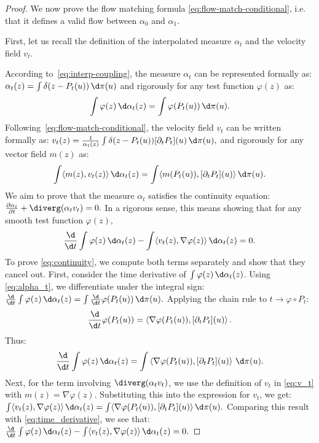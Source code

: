 \begin{proof} We now prove the flow matching formula \eqref{eq:flow-match-conditional}, i.e. that it defines a valid flow between $\alpha_0$ and $\alpha_1$.

First, let us recall the definition of the interpolated measure \(\alpha_t\) and the velocity field \(v_t\).

According to~\eqref{eq:interp-coupling}, the measure \(\alpha_t\) can be represented formally as: \(\alpha_t(z) = \int \delta(z - P_t(u)) \, \d\pi(u)\)
and rigorously for any test function \(\varphi(z)\) as:
\begin{equation}
\int \varphi(z) \, \d\alpha_t(z) = \int \varphi(P_t(u)) \, \d \pi(u). \label{eq:alpha_t}
\end{equation}
Following~\eqref{eq:flow-match-conditional}, the velocity field \(v_t\) can be written formally as: \(v_t(z) = \frac{1}{\alpha_t(z)} \int \delta(z - P_t(u)) [\partial_t P_t](u) \, \d\pi(u),\)
and rigorously for any vector field \(m(z)\) as:
\begin{equation}
\int \langle m(z), v_t(z) \rangle \, \d\alpha_t(z) = \int \langle m(P_t(u)), [\partial_t P_t](u) \rangle \, \d\pi(u). \label{eq:v_t}
\end{equation}
We aim to prove that the measure \(\alpha_t\) satisfies the continuity equation: \(\frac{\partial \alpha_t}{\partial t} + \diverg(\alpha_t v_t) = 0.\)
In a rigorous sense, this means showing that for any smooth test function \(\varphi(z)\),
\begin{equation}
\frac{\d}{\d t} \int \varphi(z) \, \d\alpha_t(z) - \int \langle v_t(z), \nabla \varphi(z) \rangle \, \d\alpha_t(z) = 0. \label{eq:continuity}
\end{equation}
To prove \eqref{eq:continuity}, we compute both terms separately and show that they cancel out. First, consider the time derivative of \(\int \varphi(z) \, \d\alpha_t(z)\). Using \eqref{eq:alpha_t}, we differentiate under the integral sign:
\(\frac{\d}{\d t} \int \varphi(z) \, \d\alpha_t(z) = \int \frac{\d}{\d t} \varphi(P_t(u)) \, \d\pi(u).\)
Applying the chain rule to \(t \to \varphi \circ P_t\):
\[
\frac{\d}{\d t} \varphi(P_t(u)) = \left\langle \nabla \varphi(P_t(u)), [\partial_t P_t](u) \right\rangle.
\]
Thus:
\begin{equation}
\frac{\d}{\d t} \int \varphi(z) \, \d\alpha_t(z) =
\int \left\langle \nabla \varphi(P_t(u)), [\partial_t P_t](u) \right\rangle \, \d\pi(u). \label{eq:time_derivative}
\end{equation}
Next, for the term involving \(\diverg(\alpha_t v_t)\), we use the definition of \(v_t\) in \eqref{eq:v_t} with \(m(z) = \nabla \varphi(z)\). Substituting this into the expression for \(v_t\), we get:
\(\int \langle v_t(z), \nabla \varphi(z) \rangle \, \d\alpha_t(z) = \int \langle \nabla \varphi(P_t(u)), [\partial_t P_t](u) \rangle \, \d \pi(u).\)
Comparing this result with \eqref{eq:time_derivative}, we see that: \(\frac{\d}{\d t} \int \varphi(z) \, \d\alpha_t(z) - \int \langle v_t(z), \nabla \varphi(z) \rangle \, \d\alpha_t(z) = 0.\)
\end{proof}
